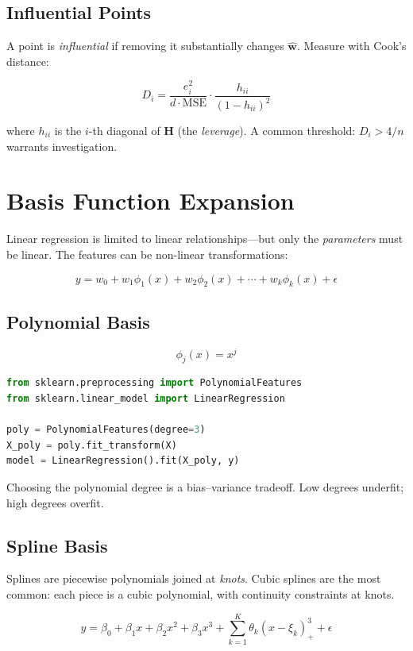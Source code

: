 \subsection{Influential Points}

A point is \emph{influential} if removing it substantially changes $\hat{\mathbf{w}}$. Measure with Cook's distance:

\[
	D_i = \frac{e_i^2}{d \cdot \text{MSE}} \cdot \frac{h_{ii}}{(1 - h_{ii})^2}
\]

where $h_{ii}$ is the $i$-th diagonal of $\mathbf{H}$ (the \emph{leverage}). A common threshold: $D_i > 4/n$ warrants investigation.

\section{Basis Function Expansion}

Linear regression is limited to linear relationships---but only the \emph{parameters} must be linear. The features can be non-linear transformations:

\[
	y = w_0 + w_1 \phi_1(x) + w_2 \phi_2(x) + \cdots + w_k \phi_k(x) + \epsilon
\]

\subsection{Polynomial Basis}

\[
	\phi_j(x) = x^j
\]

\begin{lstlisting}[language=Python, caption=Polynomial regression]
from sklearn.preprocessing import PolynomialFeatures
from sklearn.linear_model import LinearRegression

poly = PolynomialFeatures(degree=3)
X_poly = poly.fit_transform(X)
model = LinearRegression().fit(X_poly, y)
\end{lstlisting}

Choosing the polynomial degree is a bias--variance tradeoff. Low degrees underfit; high degrees overfit.

\subsection{Spline Basis}

Splines are piecewise polynomials joined at \emph{knots}. Cubic splines are the most common: each piece is a cubic polynomial, with continuity constraints at knots.

\[
	y = \beta_0 + \beta_1 x + \beta_2 x^2 + \beta_3 x^3 + \sum_{k=1}^K \theta_k (x - \xi_k)_+^3 + \epsilon
\]

